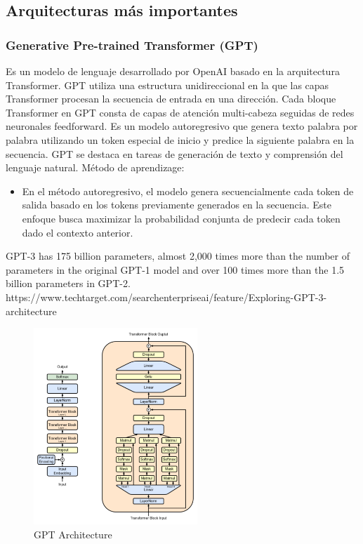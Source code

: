 \subsection{Arquitecturas más importantes}
\subsubsection{Generative Pre-trained Transformer (GPT)}
     
     Es un modelo de lenguaje desarrollado por OpenAI basado en la arquitectura Transformer. GPT utiliza una estructura unidireccional en la que las capas Transformer procesan la secuencia de entrada en una dirección. Cada bloque Transformer en GPT consta de capas de atención multi-cabeza seguidas de redes neuronales feedforward. Es un modelo autoregresivo que genera texto palabra por palabra utilizando un token especial de inicio y predice la siguiente palabra en la secuencia. GPT se destaca en tareas de generación de texto y comprensión del lenguaje natural.
     Método de aprendizage:
     \begin{itemize}
         \item En el método autoregresivo, el modelo genera secuencialmente cada token de salida basado en los tokens previamente generados en la secuencia. Este enfoque busca maximizar la probabilidad conjunta de predecir cada token dado el contexto anterior.

     \end{itemize}
    GPT-3 has 175 billion parameters, almost 2,000 times more than the number of parameters in the original GPT-1 model and over 100 times more than the 1.5 billion parameters in GPT-2.
    https://www.techtarget.com/searchenterpriseai/feature/Exploring-GPT-3-architecture
    \begin{figure}[h]
        \centering
        \includegraphics[width=0.55\textwidth]{plantilla-libro/img/gpt_architecture.png}
        \caption{GPT Architecture}
        \label{fig:gpt}
    \end{figure}
\newpage
